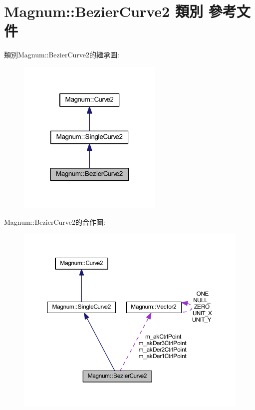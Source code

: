 \hypertarget{class_magnum_1_1_bezier_curve2}{}\section{Magnum\+:\+:Bezier\+Curve2 類別 參考文件}
\label{class_magnum_1_1_bezier_curve2}


類別\+Magnum\+:\+:Bezier\+Curve2的繼承圖\+:\nopagebreak
\begin{figure}[H]
\begin{center}
\leavevmode
\includegraphics[width=197pt]{class_magnum_1_1_bezier_curve2__inherit__graph}
\end{center}
\end{figure}


Magnum\+:\+:Bezier\+Curve2的合作圖\+:\nopagebreak
\begin{figure}[H]
\begin{center}
\leavevmode
\includegraphics[width=350pt]{class_magnum_1_1_bezier_curve2__coll__graph}
\end{center}
\end{figure}
